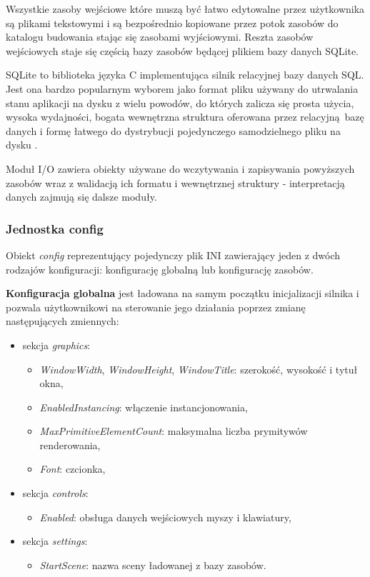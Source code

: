 Wszystkie zasoby wejściowe które muszą być łatwo edytowalne przez użytkownika są plikami tekstowymi i są bezpośrednio kopiowane przez potok zasobów do katalogu budowania stając się zasobami wyjściowymi.
Reszta zasobów wejściowych staje się częścią bazy zasobów będącej plikiem bazy danych SQLite.

SQLite \cite{SQLITE} to biblioteka języka C implementująca silnik relacyjnej bazy danych SQL.
Jest ona bardzo popularnym wyborem jako format pliku używany do utrwalania stanu aplikacji na dysku z wielu powodów, do których zalicza się prosta użycia, wysoka wydajności, bogata wewnętrzna struktura oferowana przez relacyjną bazę danych i formę łatwego do dystrybucji pojedynczego samodzielnego pliku na dysku \cite{SQLITEAPPFORMAT}.

Moduł I/O zawiera obiekty używane do wczytywania i zapisywania powyższych zasobów wraz z walidacją ich formatu i wewnętrznej struktury - interpretacją danych zajmują się dalsze moduły.

\subsubsection{Jednostka config}
Obiekt \textit{config} reprezentujący pojedynczy plik INI zawierający jeden z dwóch rodzajów konfiguracji: konfigurację globalną lub konfigurację zasobów.

\textbf{Konfiguracja globalna} jest ładowana na samym początku inicjalizacji silnika i pozwala użytkownikowi na sterowanie jego działania poprzez zmianę następujących zmiennych:
\begin{itemize}
	\item sekcja \textit{graphics}:
	\begin{itemize}
		\item \textit{WindowWidth}, \textit{WindowHeight}, \textit{WindowTitle}: szerokość, wysokość i tytuł okna,
		\item \textit{EnabledInstancing}: włączenie instancjonowania,
		\item \textit{MaxPrimitiveElementCount}: maksymalna liczba prymitywów renderowania,
		\item \textit{Font}: czcionka,
	\end{itemize}
	\item sekcja \textit{controls}:
	\begin{itemize}
		\item \textit{Enabled}: obsługa danych wejściowych myszy i klawiatury,
	\end{itemize}
	\item sekcja \textit{settings}:
	\begin{itemize}
		\item \textit{StartScene}: nazwa sceny ładowanej z bazy zasobów.
	\end{itemize}
\end{itemize}

